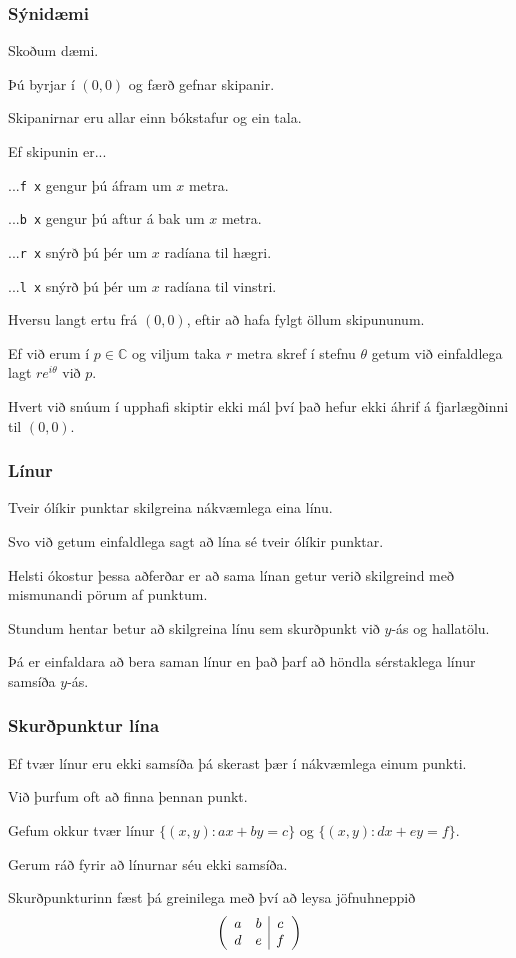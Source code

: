 {
	\frametitle{Sýnidæmi}
	{
		\item<1-> Skoðum dæmi.
		\item<2-> Þú byrjar í $(0, 0)$ og færð gefnar skipanir.
		\item<3-> Skipanirnar eru allar einn bókstafur og ein tala.
		\item<4-> Ef skipunin er...
		{
			\item<5-> ...\texttt{f x} gengur þú áfram um $x$ metra.
			\item<6-> ...\texttt{b x} gengur þú aftur á bak um $x$ metra.
			\item<7-> ...\texttt{r x} snýrð þú þér um $x$ radíana til hægri.
			\item<8-> ...\texttt{l x} snýrð þú þér um $x$ radíana til vinstri.
		}
		\item<9-> Hversu langt ertu frá $(0, 0)$, eftir að hafa fylgt öllum skipununum.
	}
}

{
	{
		\item<1-> Ef við erum í $p \in \mathbb{C}$ og viljum taka $r$ metra skref í stefnu $\theta$ getum við einfaldlega lagt $re^{i\theta}$ við $p$.
		\item<2-> Hvert við snúum í upphafi skiptir ekki mál því það hefur ekki áhrif á fjarlægðinni til $(0, 0)$.
	}
}

{
}

{
	\frametitle{Línur}
	{
		\item<1-> Tveir ólíkir punktar skilgreina nákvæmlega eina línu.
		\item<2-> Svo við getum einfaldlega sagt að lína sé tveir ólíkir punktar.
		\item<3-> Helsti ókostur þessa aðferðar er að sama línan getur verið skilgreind með mismunandi pörum af punktum.
		\item<4-> Stundum hentar betur að skilgreina línu sem skurðpunkt við $y$-ás og hallatölu. 
		\item<5-> Þá er einfaldara að bera saman línur en það þarf að höndla sérstaklega línur samsíða $y$-ás.
	}
}

\iffalse

{
	\frametitle{Skurðpunktur lína}
	{
		\item<1-> Ef tvær línur eru ekki samsíða þá skerast þær í nákvæmlega einum punkti.
		\item<2-> Við þurfum oft að finna þennan punkt.
		\item<3-> Gefum okkur tvær línur $\{(x, y) : ax + by=c\}$ og $\{(x, y) : dx + ey=f\}$.
		\item<4-> Gerum ráð fyrir að línurnar séu ekki samsíða.
		\item<5-> Skurðpunkturinn fæst þá greinilega með því að leysa jöfnuhneppið
			\[
				\left (
				\begin{array}{c c | c}
					a & b & c\\
					d & e & f
				\end{array}
				\right )
			\]
	}
}

